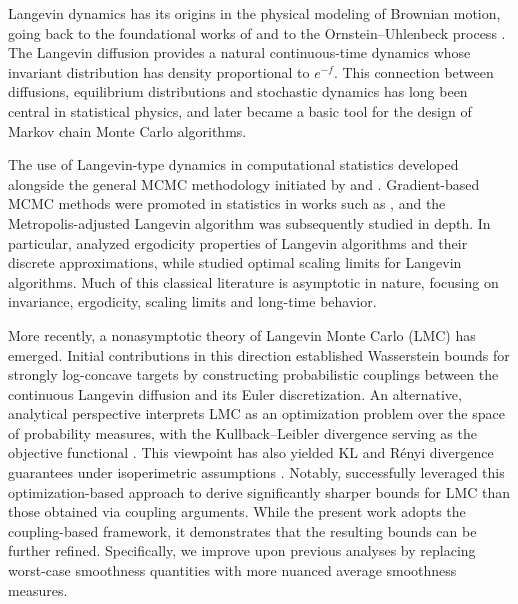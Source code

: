 \documentclass[aos,reqno]{imsart}
\theoremstyle{definition}
\begin{document}
Langevin dynamics has its origins in the physical modeling
of Brownian motion, going back to the foundational works of
\cite{einstein1905,langevin1908} and to the
Ornstein--Uhlenbeck process \citep{uhlenbeck1930}. The 
Langevin diffusion provides a natural
continuous-time dynamics whose invariant distribution has
density proportional to $e^{-f}$. This connection between
diffusions, equilibrium distributions and stochastic
dynamics has long been central in statistical physics, and
later became a basic tool for the design of Markov chain
Monte Carlo algorithms.

The use of Langevin-type dynamics in computational
statistics developed alongside the general MCMC methodology
initiated by \cite{metropolis1953} and \cite{hastings1970}.
Gradient-based MCMC methods were promoted in statistics in
works such as \cite{grenander1994representations,
besag1994comments}, and the Metropolis-adjusted Langevin
algorithm was subsequently studied in depth. In particular,
\cite{roberts1996exponential} analyzed ergodicity properties
of Langevin algorithms and their discrete approximations,
while \cite{roberts1998optimal} studied optimal scaling
limits for Langevin algorithms. Much of this classical
literature is asymptotic in nature, focusing on invariance,
ergodicity, scaling limits and long-time behavior.

More recently, a nonasymptotic theory of Langevin Monte Carlo (LMC) has emerged. Initial contributions in this direction established Wasserstein bounds for strongly log-concave targets \cite{DalalyanColt,dalalyan2019user,durmus2019} by constructing probabilistic couplings between the continuous Langevin diffusion and its Euler discretization.
An alternative, analytical perspective interprets LMC as an optimization problem over the space of probability measures, with the Kullback--Leibler divergence serving as the objective functional \citep{cheng2018kl,wibisono2018sampling,durmus2019analysis}. This viewpoint has also yielded KL and R\'enyi divergence guarantees under isoperimetric assumptions \cite{vempala2019rapid}. Notably, \cite{durmus2019analysis} successfully leveraged this optimization-based approach to derive significantly sharper bounds for LMC than those obtained via coupling arguments.
While the present work adopts the coupling-based framework, it demonstrates that the resulting bounds can be further refined. Specifically, we improve upon previous analyses by replacing worst-case smoothness quantities with more nuanced average smoothness measures.
\end{document}
